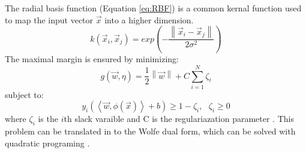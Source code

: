 The radial basis function (Equation \ref{eq:RBF}) is a common kernal function used to map the input vector $\vec{x}$ into a higher dimension.
\begin{equation}
\label{eq:RBF}
k \left ( \vec{x}_i , \vec{x}_j \right ) = exp \left ( - \frac{\left \| \vec{x}_i - \vec{x}_j \right \|}{2\sigma^2} \right ) 
\end{equation}
The maximal margin is ensured by minimizing:
\begin{equation}
\label{eq:Min}
g(\vec{w},\eta) = \frac{1}{2} \left \| \vec{w} \right \| + C \sum_{i=1}^N \zeta_i
\end{equation}
subject to:
\begin{equation}
\label{eq:Constraint}
y_i( \left \langle \vec{w},\phi(\vec{x}) \right \rangle + b ) \ge 1-\zeta_i, ~~~\zeta_i \ge 0
\end{equation}
where $\zeta_i$ is the $i$th slack varaible and C is the regulariazation parameter \cite{li_adaboost_2008}.
This problem can be translated  in to the Wolfe dual form, which can be solved with quadratic programing \cite{li_adaboost_2008}.

